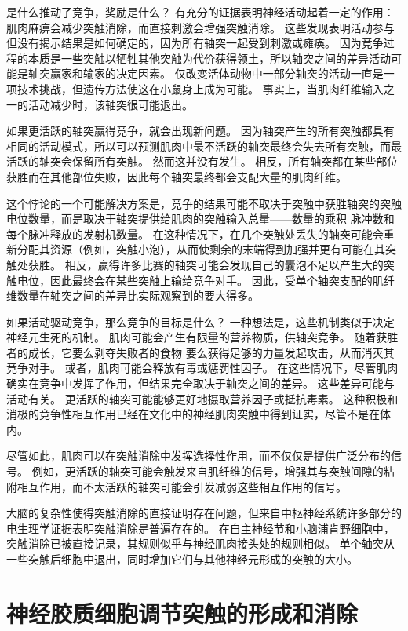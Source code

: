 是什么推动了竞争，奖励是什么？
有充分的证据表明神经活动起着一定的作用：
肌肉麻痹会减少突触消除，而直接刺激会增强突触消除。
这些发现表明活动参与但没有揭示结果是如何确定的，因为所有轴突一起受到刺激或瘫痪。
因为竞争过程的本质是一些突触以牺牲其他突触为代价获得领土，所以轴突之间的差异活动可能是轴突赢家和输家的决定因素。
仅改变活体动物中一部分轴突的活动一直是一项技术挑战，但遗传方法使这在小鼠身上成为可能。
事实上，当肌肉纤维输入之一的活动减少时，该轴突很可能退出。


如果更活跃的轴突赢得竞争，就会出现新问题。
因为轴突产生的所有突触都具有相同的活动模式，所以可以预测肌肉中最不活跃的轴突最终会失去所有突触，而最活跃的轴突会保留所有突触。
然而这并没有发生。
相反，所有轴突都在某些部位获胜而在其他部位失败，因此每个轴突最终都会支配大量的肌肉纤维。


这个悖论的一个可能解决方案是，竞争的结果可能不取决于突触中获胜轴突的突触电位数量，而是取决于轴突提供给肌肉的突触输入总量——数量的乘积 脉冲数和每个脉冲释放的发射机数量。
在这种情况下，在几个突触处丢失的轴突可能会重新分配其资源（例如，突触小泡），从而使剩余的末端得到加强并更有可能在其突触处获胜。
相反，赢得许多比赛的轴突可能会发现自己的囊泡不足以产生大的突触电位，因此最终会在某些突触上输给竞争对手。
因此，受单个轴突支配的肌纤维数量在轴突之间的差异比实际观察到的要大得多。


如果活动驱动竞争，那么竞争的目标是什么？
一种想法是，这些机制类似于决定神经元生死的机制。
肌肉可能会产生有限量的营养物质，供轴突竞争。
随着获胜者的成长，它要么剥夺失败者的食物
要么获得足够的力量发起攻击，从而消灭其竞争对手。 或者，肌肉可能会释放有毒或惩罚性因子。
在这些情况下，尽管肌肉确实在竞争中发挥了作用，但结果完全取决于轴突之间的差异。
这些差异可能与活动有关。
更活跃的轴突可能能够更好地摄取营养因子或抵抗毒素。
这种积极和消极的竞争性相互作用已经在文化中的神经肌肉突触中得到证实，尽管不是在体内。


尽管如此，肌肉可以在突触消除中发挥选择性作用，而不仅仅是提供广泛分布的信号。
例如，更活跃的轴突可能会触发来自肌纤维的信号，增强其与突触间隙的粘附相互作用，而不太活跃的轴突可能会引发减弱这些相互作用的信号。


大脑的复杂性使得突触消除的直接证明存在问题，但来自中枢神经系统许多部分的电生理学证据表明突触消除是普遍存在的。
在自主神经节和小脑浦肯野细胞中，突触消除已被直接记录，其规则似乎与神经肌肉接头处的规则相似。
单个轴突从一些突触后细胞中退出，同时增加它们与其他神经元形成的突触的大小。



\section{神经胶质细胞调节突触的形成和消除}

